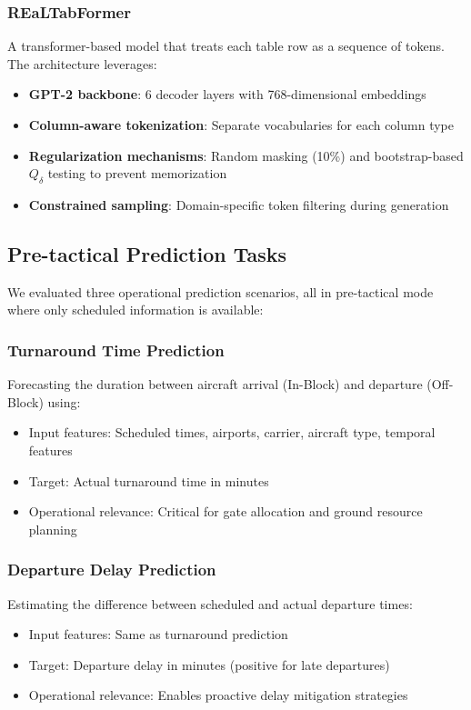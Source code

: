 \documentclass[conference]{IEEEtran}
\begin{document}
\subsubsection{REaLTabFormer}
A transformer-based model that treats each table row as a sequence of tokens. The architecture leverages:
\begin{itemize}
    \item \textbf{GPT-2 backbone}: 6 decoder layers with 768-dimensional embeddings
    \item \textbf{Column-aware tokenization}: Separate vocabularies for each column type
    \item \textbf{Regularization mechanisms}: Random masking (10\%) and bootstrap-based $Q_\delta$ testing to prevent memorization
    \item \textbf{Constrained sampling}: Domain-specific token filtering during generation
\end{itemize}

\subsection{Pre-tactical Prediction Tasks}

We evaluated three operational prediction scenarios, all in pre-tactical mode where only scheduled information is available:

\subsubsection{Turnaround Time Prediction}
Forecasting the duration between aircraft arrival (In-Block) and departure (Off-Block) using:
\begin{itemize}
    \item Input features: Scheduled times, airports, carrier, aircraft type, temporal features
    \item Target: Actual turnaround time in minutes
    \item Operational relevance: Critical for gate allocation and ground resource planning
\end{itemize}

\subsubsection{Departure Delay Prediction}
Estimating the difference between scheduled and actual departure times:
\begin{itemize}
    \item Input features: Same as turnaround prediction
    \item Target: Departure delay in minutes (positive for late departures)
    \item Operational relevance: Enables proactive delay mitigation strategies
\end{itemize}
\end{document}
